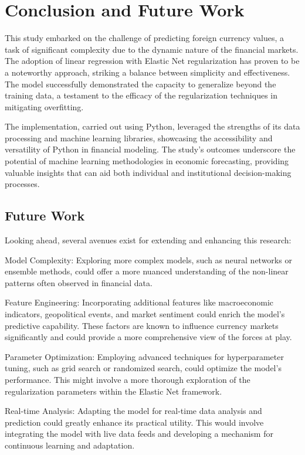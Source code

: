 \documentclass[conference]{IEEEtran}
\begin{document}
\section{Conclusion and Future Work}
This study embarked on the challenge of predicting foreign currency values, a task of significant complexity due to the dynamic nature of the financial markets. The adoption of linear regression with Elastic Net regularization has proven to be a noteworthy approach, striking a balance between simplicity and effectiveness. The model successfully demonstrated the capacity to generalize beyond the training data, a testament to the efficacy of the regularization techniques in mitigating overfitting.

The implementation, carried out using Python, leveraged the strengths of its data processing and machine learning libraries, showcasing the accessibility and versatility of Python in financial modeling. The study's outcomes underscore the potential of machine learning methodologies in economic forecasting, providing valuable insights that can aid both individual and institutional decision-making processes.

\subsection{Future Work}
Looking ahead, several avenues exist for extending and enhancing this research:

Model Complexity: Exploring more complex models, such as neural networks or ensemble methods, could offer a more nuanced understanding of the non-linear patterns often observed in financial data.

Feature Engineering: Incorporating additional features like macroeconomic indicators, geopolitical events, and market sentiment could enrich the model's predictive capability. These factors are known to influence currency markets significantly and could provide a more comprehensive view of the forces at play.

Parameter Optimization: Employing advanced techniques for hyperparameter tuning, such as grid search or randomized search, could optimize the model's performance. This might involve a more thorough exploration of the regularization parameters within the Elastic Net framework.

Real-time Analysis: Adapting the model for real-time data analysis and prediction could greatly enhance its practical utility. This would involve integrating the model with live data feeds and developing a mechanism for continuous learning and adaptation.
\end{document}
